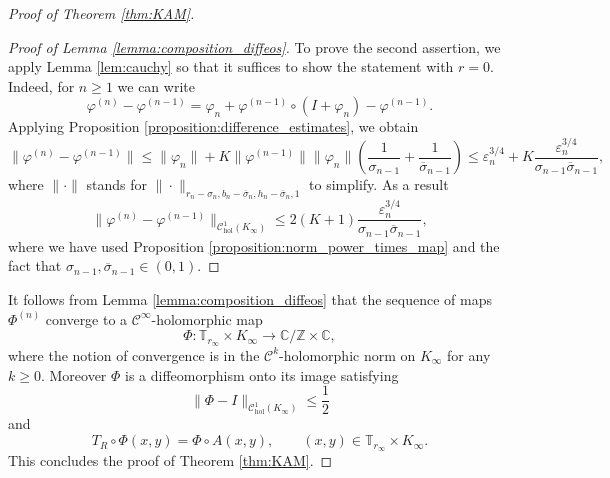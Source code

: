 \documentclass[10pt,a4paper]{amsart}
\newcommand{\C}{\mathbb{C}}
\newcommand{\T}{\mathbb{T}}
\newcommand{\Z}{\mathbb{Z}}
\begin{document}
\begin{proof}[Proof of Theorem \ref{thm:KAM}]
\begin{proof}[Proof of Lemma \ref{lemma:composition_diffeos}]
    To prove the second assertion, we apply Lemma \ref{lem:cauchy} so that it suffices to show the statement with $r=0$. Indeed, for $n\geq 1$ we can write
    \[
    \varphi^{(n)}-\varphi^{(n-1)}
    =
    \varphi_{n}
    +
    \varphi^{(n-1)}\circ(I+\varphi_{n})-\varphi^{(n-1)}.
    \]
    Applying Proposition \ref{proposition:difference_estimates}, we obtain
    \[
    \|\varphi^{(n)}-\varphi^{(n-1)}\|
    \leq
    \|\varphi_n\|
    +
    K\|\varphi^{(n-1)}\|\|\varphi_n\|
    \left(\frac{1}{\sigma_{n-1}}+\frac{1}{\overline\sigma_{n-1}}\right)
    \leq 
    \varepsilon_n^{3/4}+K\frac{\varepsilon_n^{3/4}}{\sigma_{n-1}\overline\sigma_{n-1}},
    \]
    where 
    $\|\cdot\|$ stands for $\|\cdot\|_{r_n-\sigma_n, b_n-\overline\sigma_n, h_n-\overline\sigma_n,1}$ to simplify. As a result
    \[
    \|\varphi^{(n)}-\varphi^{(n-1)}\|_{\mathscr C^1_{\text{hol}}(K_\infty)} \leq 2(K+1)\frac{\varepsilon_n^{3/4}}{\sigma_{n-1}\overline\sigma_{n-1}},
    \]
    where we have used Proposition \ref{proposition:norm_power_times_map} and the fact that $\sigma_{n-1},\overline\sigma_{n-1}\in(0,1)$.
\end{proof}

It follows from Lemma \ref{lemma:composition_diffeos} that the sequence of maps $\Phi^{(n)}$ converge to a $\mathscr C^{\infty}$-holomorphic map
\[
\Phi:\T_{r_{\infty}}\times K_\infty\to\C/\Z\times \C,
\]
where the notion of convergence is in the $\mathscr C^k$-holomorphic norm on $K_{\infty}$ for any $k\geq0$. Moreover $\Phi$ is a diffeomorphism onto its image satisfying
\[
\|\Phi-I\|_{\mathscr C^1_{\text{hol}}(K_\infty)}\leq \frac{1}{2}
\]
and
\[
T_R\circ\Phi(x,y)=\Phi\circ A(x,y),
\qquad
(x,y)\in\T_{r_\infty}\times K_\infty.
\]
This concludes the proof of Theorem \ref{thm:KAM}.
\end{proof}
\end{document}
